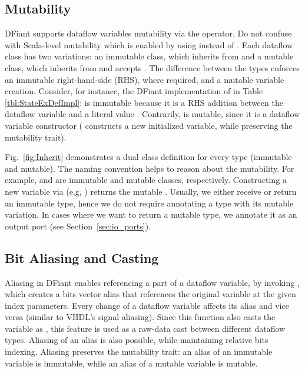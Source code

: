 \subsection{Mutability}
\label{sec:mutability}
DFiant supports dataflow variables mutability via the \code{:=} operator. Do not confuse with Scala-level mutability which is enabled by using  instead of . Each dataflow class has two variations: an immutable class, which inherits from  and a mutable class, which inherits from  and accepts \code{:=}. The difference between the types enforces an immutable right-hand-side (RHS), where required, and a mutable variable creation. Consider, for instance, the DFiant implementation of  in Table \ref{tbl:StateExDefImpl}:  is immutable because it is a RHS addition between the dataflow variable  and a literal value . Contrarily,  is mutable, since it is a dataflow variable constructor ( constructs a new initialized variable, while preserving the mutability trait). 

Fig.~\ref{fig:Inherit} demonstrates a dual class definition for every type  (immutable and mutable). The naming convention helps to reason about the mutability. For example,  and  are immutable and mutable classes, respectively. Constructing a new variable via  (e.g, ) returns the mutable . Usually, we either receive or return an immutable type, hence we do not require annotating a type with its mutable variation. In cases where we want to return a mutable type, we annotate it as an output port (see Section~\ref{sec:io_ports}).





\subsection{Bit Aliasing and Casting}
Aliasing in DFiant enables referencing a part of a dataflow variable, by invoking , which creates a bits vector alias that references the original variable at the given index parameters. Every change of a dataflow variable affects its alias and vice versa (similar to VHDL's signal aliasing). Since this function also casts the variable as , this feature is used as a raw-data cast between different dataflow types. Aliasing of an alias is also possible, while maintaining relative bits indexing. Aliasing preserves the mutability trait: an alias of an immutable variable is immutable, while an alias of a mutable variable is mutable. 

